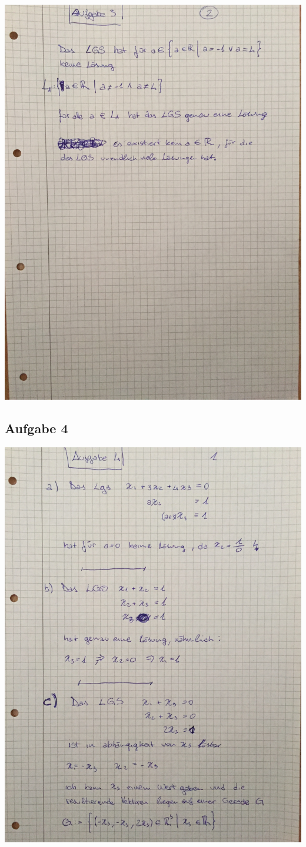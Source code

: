 \documentclass[10pt,a4paper]{article}
\begin{document}
\includegraphics[scale=0.2, angle=270]{A3_2.jpg}

\subsection{Aufgabe 4}
\includegraphics[scale=0.2, angle=270]{A4_1.jpg}
\end{document}
